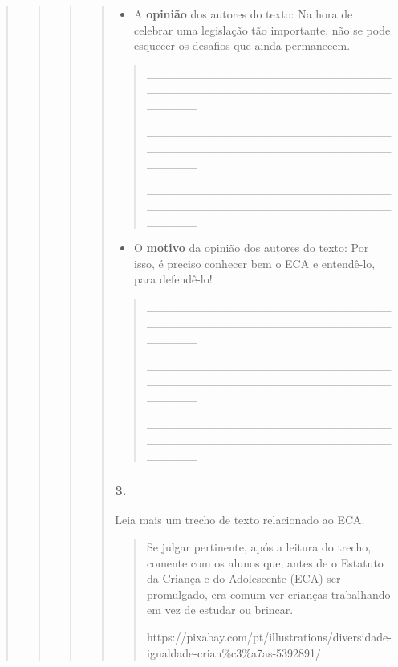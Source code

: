 \begin{quote}
\begin{quote}
\begin{quote}
\begin{quote}
\begin{itemize}
\item
  A \textbf{opinião} dos autores do texto: Na hora de celebrar uma
  legislação tão importante, não se pode esquecer os desafios que ainda
  permanecem.
\end{itemize}

\begin{quote}
\_\_\_\_\_\_\_\_\_\_\_\_\_\_\_\_\_\_\_\_\_\_\_\_\_\_\_\_\_\_\_\_\_\_\_\_\_\_\_\_\_\_\_\_\_\_\_\_\_\_\_\_\_\_\_\_\_\_\_\_\_\_\_\_

\_\_\_\_\_\_\_\_\_\_\_\_\_\_\_\_\_\_\_\_\_\_\_\_\_\_\_\_\_\_\_\_\_\_\_\_\_\_\_\_\_\_\_\_\_\_\_\_\_\_\_\_\_\_\_\_\_\_\_\_\_\_\_\_

\_\_\_\_\_\_\_\_\_\_\_\_\_\_\_\_\_\_\_\_\_\_\_\_\_\_\_\_\_\_\_\_\_\_\_\_\_\_\_\_\_\_\_\_\_\_\_\_\_\_\_\_\_\_\_\_\_\_\_\_\_\_\_\_
\end{quote}

\begin{itemize}
\item
  O \textbf{motivo} da opinião dos autores do texto: Por isso, é preciso
  conhecer bem o ECA e entendê-lo, para defendê-lo!
\end{itemize}

\begin{quote}
\_\_\_\_\_\_\_\_\_\_\_\_\_\_\_\_\_\_\_\_\_\_\_\_\_\_\_\_\_\_\_\_\_\_\_\_\_\_\_\_\_\_\_\_\_\_\_\_\_\_\_\_\_\_\_\_\_\_\_\_\_\_\_\_

\_\_\_\_\_\_\_\_\_\_\_\_\_\_\_\_\_\_\_\_\_\_\_\_\_\_\_\_\_\_\_\_\_\_\_\_\_\_\_\_\_\_\_\_\_\_\_\_\_\_\_\_\_\_\_\_\_\_\_\_\_\_\_\_

\_\_\_\_\_\_\_\_\_\_\_\_\_\_\_\_\_\_\_\_\_\_\_\_\_\_\_\_\_\_\_\_\_\_\_\_\_\_\_\_\_\_\_\_\_\_\_\_\_\_\_\_\_\_\_\_\_\_\_\_\_\_\_\_
\end{quote}

\subsubsection{3. }\label{section-62}

Leia mais um trecho de texto relacionado ao ECA.

\begin{quote}
Se julgar pertinente, após a leitura do trecho, comente com os alunos
que, antes de o Estatuto da Criança e do Adolescente (ECA) ser
promulgado, era comum ver crianças trabalhando em vez de estudar ou
brincar.

https://pixabay.com/pt/illustrations/diversidade-igualdade-crian\%c3\%a7as-5392891/


\end{quote}
\end{quote}
\end{quote}
\end{quote}
\end{quote}
